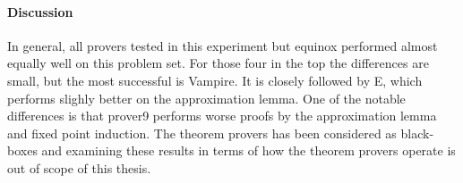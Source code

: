 \paragraph{Discussion}
In general, all provers tested in this experiment but equinox
performed almost equally well on this problem set. For those four in
the top the differences are small, but the most successful is
Vampire. It is closely followed by E, which performs slighly better on
the approximation lemma. One of the notable differences is that
prover9 performs worse proofs by the approximation lemma and fixed
point induction. The theorem provers has been considered as
black-boxes and examining these results in terms of how the theorem
provers operate is out of scope of this thesis.

\begin{comment}

A striking observation is that the approximation lemma is the most
successful of proving techniques for Theorems. As we saw in the
previous section, it intersects definitional equality on 37
properties, and 8 of its uniquely proved properties could be proved
with definitional equality if it had more typing information, and the
last one if fixed point induction did more inlining. However, after
definitional equality, it is also the easiest to formulate and
implement.

Structural induction could become even stronger if the combinatorial
explosion when generating induction hypotheses could be
restricted. Currently, it creates all smaller trees than the induction
conclusion, but another alternative is to use all sub trees.

Definitional equality is only applicable for properties with only
abstract arguments. There are some notable files in the test suite
with these, \ts{Functions}, \ts{MonadEnv} and \ts{MonadState}, and
most successes come from there. Should the translation be changed so
that it also applicable on concrete arguments, it would also be able
to prove properties from for example \ts{Bool}, and intersect
structural induction that currently proves these techniques.


\section{Results per File}

To compare the different kinds of properties from the files of the
test suite the results per file can be viewed in Table
\ref{tbl:allstats}.


\end{comment}
